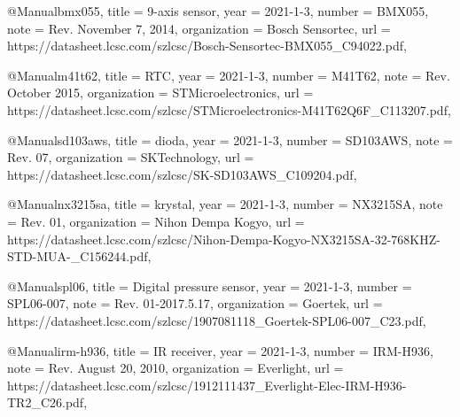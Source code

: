@Manual{bmx055,
    title        = {9-axis sensor},
    year         = {2021-1-3},
    number       = {BMX055},
    note         = {Rev.  November 7, 2014},
    organization = {Bosch Sensortec},
    url          = {https://datasheet.lcsc.com/szlcsc/Bosch-Sensortec-BMX055_C94022.pdf},
}

@Manual{m41t62,
    title        = {RTC},
    year         = {2021-1-3},
    number       = {M41T62},
    note         = {Rev. October 2015},
    organization = {STMicroelectronics},
    url          = {https://da\-ta\-sheet\-.lcsc.com/szlcsc/STMicroelectronics-M41T62Q6F_C113207.pdf},
}

@Manual{sd103aws,
    title        = {dioda},
    year         = {2021-1-3},
    number       = {SD103AWS},
    note         = {Rev. 07},
    organization = {SKTechnology},
    url          = {https://datasheet.lcsc\-.\-com\-/szlcsc/SK-SD103AWS_C109204.pdf},
}

@Manual{nx3215sa,
    title        = {krystal},
    year         = {2021-1-3},
    number       = {NX3215SA},
    note         = {Rev. 01}, %
    organization = {Nihon Dempa Kogyo},
    url          = {https://datasheet\-.\-lcsc\-.com/szlcsc/Nihon-Dempa-Kogyo-NX3215SA-32-768KHZ-STD-MUA-\-_C156244.pdf},
}

@Manual{spl06,
    title        = {Digital pressure sensor},
    year         = {2021-1-3},
    number       = {SPL06-007},
    note         = {Rev. 01-2017.5.17},
    organization = {Goertek},
    url          = {https://datasheet.lcsc.com/szlcsc/1907081118_Goertek-SPL06-007_C23\-.pdf},
}

@Manual{irm-h936,
    title        = {IR receiver},
    year         = {2021-1-3},
    number       = {IRM-H936},
    note         = {Rev. August 20, 2010},
    organization = {Everlight},
    url          = {https://da\-ta\-sheet\-.lcsc.com/szlcsc/1912111437_Everlight-Elec-IRM-H936-TR2_C26\-.pdf},
}

